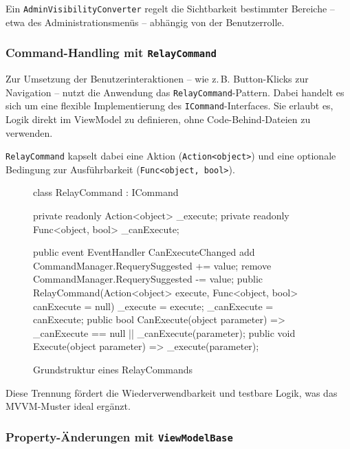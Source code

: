 Ein \texttt{AdminVisibilityConverter} regelt die Sichtbarkeit bestimmter Bereiche – etwa des Administrationsmenüs – abhängig von der Benutzerrolle.

\subsubsection*{Command-Handling mit \texttt{RelayCommand}}

Zur Umsetzung der Benutzerinteraktionen – wie z.\,B. Button-Klicks zur Navigation – nutzt die Anwendung das \texttt{RelayCommand}-Pattern. Dabei handelt es sich um eine flexible Implementierung des \texttt{ICommand}-Interfaces. Sie erlaubt es, Logik direkt im ViewModel zu definieren, ohne Code-Behind-Dateien zu verwenden.

\texttt{RelayCommand} kapselt dabei eine Aktion (\texttt{Action<object>}) und eine optionale Bedingung zur Ausführbarkeit (\texttt{Func<object, bool>}).

\begin{figure}[H]
    \centering
    \begin{cs}
class RelayCommand : ICommand
{
    private readonly Action<object> _execute;
    private readonly Func<object, bool> _canExecute;

    public event EventHandler CanExecuteChanged
    {
        add { CommandManager.RequerySuggested += value; }
        remove { CommandManager.RequerySuggested -= value; }
    }
    public RelayCommand(Action<object> execute, Func<object, bool> canExecute = null)
    {
        _execute = execute;
        _canExecute = canExecute;
    }
    public bool CanExecute(object parameter) => _canExecute == null || _canExecute(parameter);
    public void Execute(object parameter) => _execute(parameter);
}
\end{cs}
    \caption{Grundstruktur eines RelayCommands}
\end{figure}

Diese Trennung fördert die Wiederverwendbarkeit und testbare Logik, was das MVVM-Muster ideal ergänzt.

\subsubsection*{Property-Änderungen mit \texttt{ViewModelBase}}

